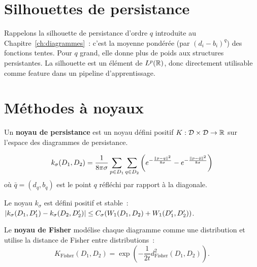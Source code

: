 \section{Silhouettes de persistance}
\label{sec:silhouettes}

Rappelons la silhouette de persistance d'ordre $q$ introduite au
Chapitre~\ref{ch:diagrammes}~: c'est la moyenne pond\'er\'ee (par
$(d_i - b_i)^q$) des fonctions tentes. Pour $q$ grand, elle donne plus
de poids aux structures persistantes. La silhouette est un \'el\'ement
de $L^p(\mathbb{R})$, donc directement utilisable comme feature dans un
pipeline d'apprentissage.

\section{M\'ethodes \`a noyaux}
\label{sec:noyaux}

\begin{definition}
Un \textbf{noyau de persistance} est un noyau d\'efini positif
$K : \mathcal{D} \times \mathcal{D} \to \mathbb{R}$ sur l'espace des
diagrammes de persistance.
\end{definition}

\begin{definition}
\[
  k_\sigma(D_1, D_2) = \frac{1}{8\pi\sigma}
  \sum_{p \in D_1} \sum_{q \in D_2}
  \left(e^{-\frac{\left\| p - q \right\|^2}{8\sigma}}
  - e^{-\frac{\left\| p - \bar{q} \right\|^2}{8\sigma}}\right)
\]
o\`u $\bar{q} = (d_q, b_q)$ est le point $q$ r\'efl\'echi par rapport
\`a la diagonale.
\end{definition}

\begin{proposition}
Le noyau $k_\sigma$ est d\'efini positif et stable~:
$\left| k_\sigma(D_1, D_1') - k_\sigma(D_2, D_2') \right| \leq
C_\sigma (W_1(D_1, D_2) + W_1(D_1', D_2'))$.
\end{proposition}

\begin{definition}
Le \textbf{noyau de Fisher} mod\'elise chaque diagramme comme une
distribution et utilise la distance de Fisher entre distributions~:
\[
  K_{\mathrm{Fisher}}(D_1, D_2) = \exp\!\left(
  -\frac{1}{2t} d_{\mathrm{Fisher}}^2(D_1, D_2)\right).
\]
\end{definition}

